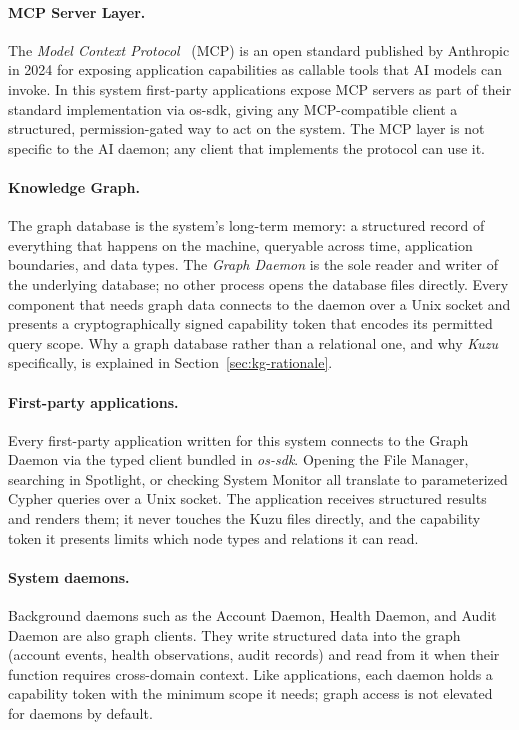 \paragraph{MCP Server Layer.}
The \emph{Model Context Protocol}~\cite{mcp:spec} (MCP) is an open standard
published by Anthropic in 2024 for exposing application capabilities as callable
tools that AI models can invoke. In this system first-party applications expose
MCP servers as part of their standard implementation via os-sdk, giving any
MCP-compatible client a structured, permission-gated way to act on the system.
The MCP layer is not specific to the AI daemon; any client that implements the
protocol can use it.

\paragraph{Knowledge Graph.}
The graph database is the system's long-term memory: a structured record of
everything that happens on the machine, queryable across time, application
boundaries, and data types. The \emph{Graph Daemon} is the sole reader and
writer of the underlying database; no other process opens the database files
directly. Every component that needs graph data connects to the daemon over a
Unix socket and presents a cryptographically signed capability token that encodes
its permitted query scope. Why a graph database rather than a relational one,
and why \emph{Kuzu}~\cite{kuzu} specifically, is explained in
Section~\ref{sec:kg-rationale}.

\paragraph{First-party applications.}
Every first-party application written for this system connects to the Graph
Daemon via the typed client bundled in \emph{os-sdk}. Opening the File Manager,
searching in Spotlight, or checking System Monitor all translate to parameterized
Cypher queries over a Unix socket. The application receives structured results
and renders them; it never touches the Kuzu files directly, and the capability
token it presents limits which node types and relations it can read.

\paragraph{System daemons.}
Background daemons such as the Account Daemon, Health Daemon, and Audit Daemon
are also graph clients. They write structured data into the graph (account
events, health observations, audit records) and read from it when their function
requires cross-domain context. Like applications, each daemon holds a
capability token with the minimum scope it needs; graph access is not elevated
for daemons by default.

